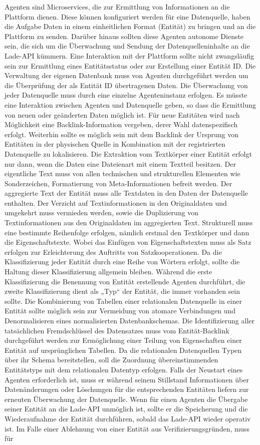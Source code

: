 Agenten sind Microservices, die zur Ermittlung von Informationen an die Plattform dienen. Diese können konfiguriert werden für eine Datenquelle, haben die Aufgabe Daten in einem einheitlichen Format (Entität) zu bringen und an die Plattform zu senden. Darüber hinaus sollten diese Agenten autonome Dienste sein, die sich um die Überwachung und Sendung der Datenquelleninhalte an die Lade-API kümmern. Eine Interaktion mit der Plattform sollte nicht zwangsläufig sein zur Ermittlung eines Entitätsstatus oder zur Erstellung einer Entität ID. Die Verwaltung der eigenen Datenbank muss von Agenten durchgeführt werden um die Überprüfung der als Entität ID übertragenen Daten. Die Überwachung von jeder Datenquelle muss durch eine einzelne Agenteninstanz erfolgen. Es müsste eine Interaktion zwischen Agenten und Datenquelle geben, so dass die Ermittlung von neuen oder geänderten Daten möglich ist. Für neue Entitäten wird nach Möglichkeit eine Backlink-Information vergeben, derer Wahl datenspezifisch erfolgt. Weiterhin sollte es möglich sein mit dem Backlink der Ursprung von Entitäten in der physischen Quelle in Kombination mit der registrierten Datenquelle zu lokalisieren. Die Extraktion vom Textkörper einer Entität erfolgt nur dann, wenn die Daten eine Dateienart mit einem Textteil besitzen. Der eigentliche Text muss von allen technischen und strukturellen Elementen wie Sonderzeichen, Formatierung von Meta-Informationen befreit werden. Der aggregierte Text der Entität muss alle Textdaten in den Daten der Datenquelle enthalten. Der Verzicht auf Textinformationen in den Originaldaten und umgekehrt muss vermieden werden, sowie die Duplizierung von Textinformationen aus den Originaldaten im aggregierten Text. Strukturell muss eine bestimmte Reihenfolge erfolgen, nämlich erstmal den Textkörper und dann die Eigenschaftstexte. Wobei das Einfügen von Eigenschaftstexten muss als Satz erfolgen zur Erleichterung des Auftritts von Satzkooperationen. Da die Klassifizierung jeder Entität durch eine Reihe von Wörtern erfolgt, sollte die Haltung dieser Klassifizierung allgemein bleiben. Während die erste Klassifizierung die Benennung von Entität erstellende Agenten durchführt, die zweite Klassifizierung dient als „Typ“ der Entität, die immer vorhanden sein sollte. Die Kombinierung von Tabellen einer relationalen Datenquelle in einer Entität sollte möglich sein zur Vermeidung von atomare Verbindungen und Denormalisieren eines normalisierten Datenbankschemas. Die Identifizierung aller tatsächlichen Fremdschlüssel des Datensatzes muss vom Entität-Backlink durchgeführt werden zur Ermöglichung einer Teilung von Eigenschaften einer Entität auf ursprünglichen Tabellen. Da die relationalen Datenquellen Typen über ihr Schema bereitstellen, soll die Zuordnung übereinstimmenden Entitätstyps mit dem relationalen Datentyp erfolgen. Falls der Neustart eines Agenten erforderlich ist, muss er während seinem Stillstand Informationen über Datenänderungen oder Löschungen für die entsprechenden Entitäten liefern zur erneuten Überwachung der Datenquelle. Wenn für einen Agenten die Übergabe seiner Entität an die Lade-API unmöglich ist, sollte er die Speicherung und die Wiederaufnahme der Entität durchführen, sobald das Lade-API wieder operativ ist. Im Falle einer Ablehnung von einer Entität aus Verifizierungsgründen, muss für 